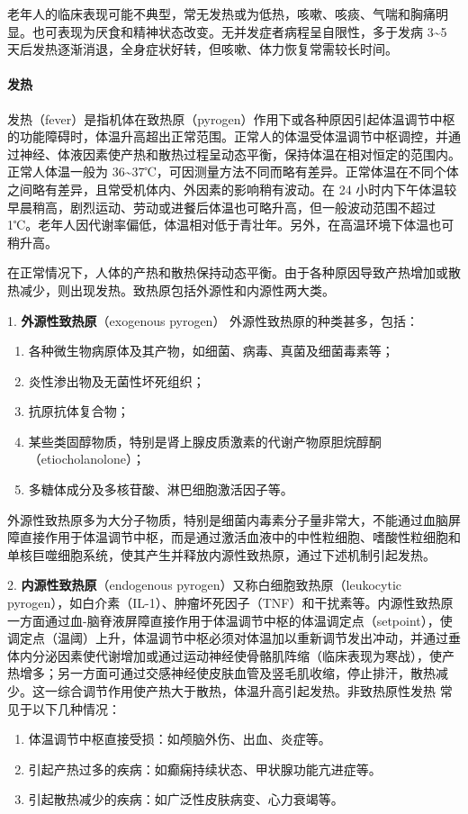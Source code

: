 \documentclass[9pt,a4paper,twoside]{rho-class/rho}
\begin{document}
    老年人的临床表现可能不典型，常无发热或为低热，咳嗽、咳痰、气喘和胸痛明显。也可表现为厌食和精神状态改变。无并发症者病程呈自限性，多于发病 3\textasciitilde5 天后发热逐渐消退，全身症状好转，但咳嗽、体力恢复常需较长时间。

    \paragraph{发热} 发热（fever）是指机体在致热原（pyrogen）作用下或各种原因引起体温调节中枢的功能障碍时，体温升高超出正常范围。正常人的体温受体温调节中枢调控，并通过神经、体液因素使产热和散热过程呈动态平衡，保持体温在相对恒定的范围内。正常人体温一般为 36\textasciitilde37℃，可因测量方法不同而略有差异。正常体温在不同个体之间略有差异，且常受机体内、外因素的影响稍有波动。在 24 小时内下午体温较早晨稍高，剧烈运动、劳动或进餐后体温也可略升高，但一般波动范围不超过 1℃。老年人因代谢率偏低，体温相对低于青壮年。另外，在高温环境下体温也可稍升高。

    在正常情况下，人体的产热和散热保持动态平衡。由于各种原因导致产热增加或散热减少，则出现发热。致热原包括外源性和内源性两大类。

    1. \textbf{外源性致热原}（exogenous pyrogen） 外源性致热原的种类甚多，包括：
    \begin{enumerate}
            \item 各种微生物病原体及其产物，如细菌、病毒、真菌及细菌毒素等；
            \item 炎性渗出物及无菌性坏死组织；
            \item 抗原抗体复合物；
            \item 某些类固醇物质，特别是肾上腺皮质激素的代谢产物原胆烷醇酮（etiocholanolone）；
            \item 多糖体成分及多核苷酸、淋巴细胞激活因子等。
    \end{enumerate}

    外源性致热原多为大分子物质，特别是细菌内毒素分子量非常大，不能通过血脑屏障直接作用于体温调节中枢，而是通过激活血液中的中性粒细胞、嗜酸性粒细胞和单核巨噬细胞系统，使其产生并释放内源性致热原，通过下述机制引起发热。

    2. \textbf{内源性致热原}（endogenous pyrogen）又称白细胞致热原（leukocytic pyrogen），如白介素（IL-1）、肿瘤坏死因子（TNF）和干扰素等。内源性致热原一方面通过血-脑脊液屏障直接作用于体温调节中枢的体温调定点（setpoint），使调定点（温阈）上升，体温调节中枢必须对体温加以重新调节发出冲动，并通过垂体内分泌因素使代谢增加或通过运动神经使骨骼肌阵缩（临床表现为寒战），使产热增多；另一方面可通过交感神经使皮肤血管及竖毛肌收缩，停止排汗，散热减少。这一综合调节作用使产热大于散热，体温升高引起发热。非致热原性发热 常见于以下几种情况：
    \begin{enumerate}
            \item 体温调节中枢直接受损：如颅脑外伤、出血、炎症等。
            \item 引起产热过多的疾病：如癫痫持续状态、甲状腺功能亢进症等。
            \item 引起散热减少的疾病：如广泛性皮肤病变、心力衰竭等。
    \end{enumerate}
\end{document}
